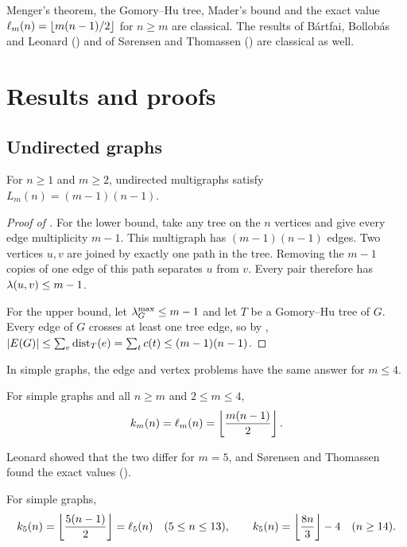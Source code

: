 Menger's theorem, the Gomory--Hu tree, Mader's bound and the exact value $\ell_m(n)=\left\lfloor m(n-1)/2 \right\rfloor$ for $n\ge m$ are classical.
The results of B\'{a}rtfai, Bollob\'{a}s and Leonard () and of S{\o}rensen and Thomassen () are classical as well.


\section{Results and proofs}\label{sec:results}

\subsection{Undirected graphs}

\begin{theorem}\label{thm:multigraph-edge}
For $n\ge1$ and $m\ge2$, undirected multigraphs satisfy $L_m(n) = (m-1)(n-1)$.
\end{theorem}

\begin{proof}[Proof of ]
For the lower bound, take any tree on the $n$ vertices and give every edge multiplicity $m-1$.
This multigraph has $(m-1)(n-1)$ edges.
Two vertices $u,v$ are joined by exactly one path in the tree.
Removing the $m-1$ copies of one edge of this path separates $u$ from $v$.
Every pair therefore has $\lambda(u,v)\le m-1$.

For the upper bound, let $\lambda_G^{\max}\le m-1$ and let $T$ be a Gomory--Hu tree of $G$. Every edge of $G$ crosses at least one tree edge, so by , $|E(G)| \le \sum_e \operatorname{dist}_T(e) = \sum_t c(t) \le (m-1)(n-1)$.
\end{proof}

In simple graphs, the edge and vertex problems have the same answer for $m\le4$.

\begin{theorem}\label{thm:leonard}
For simple graphs and all $n\ge m$ and $2\le m\le4$,
\[
    k_m(n) = \ell_m(n) = \left\lfloor \frac{m(n-1)}{2} \right\rfloor.
\]
\end{theorem}

Leonard \cite{Leonard72b} showed that the two differ for $m=5$, and S{\o}rensen and Thomassen found the exact values ().

\begin{theorem}\label{thm:sorensen-thomassen}
For simple graphs,
\[
    k_5(n) = \left\lfloor \frac{5(n-1)}{2} \right\rfloor = \ell_5(n) \quad (5 \le n \le 13),
    \qquad
    k_5(n) = \left\lfloor \frac{8n}{3} \right\rfloor - 4 \quad (n \ge 14).
\]
\end{theorem}

